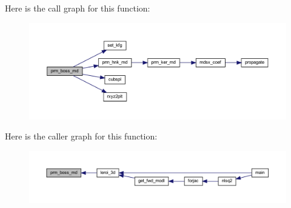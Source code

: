 Here is the call graph for this function\+:\nopagebreak
\begin{figure}[H]
\begin{center}
\leavevmode
\includegraphics[width=350pt]{Leroi_8f90_ac15aa4c46264754ea7abffbe2ea1926c_cgraph}
\end{center}
\end{figure}
Here is the caller graph for this function\+:\nopagebreak
\begin{figure}[H]
\begin{center}
\leavevmode
\includegraphics[width=350pt]{Leroi_8f90_ac15aa4c46264754ea7abffbe2ea1926c_icgraph}
\end{center}
\end{figure}
\mbox{\label{Leroi_8f90_a8fe568053ec398fc50ab206827a43d81}} 
